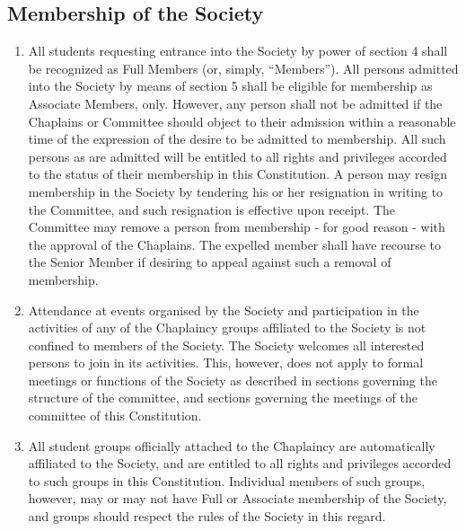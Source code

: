 \documentclass[11pt]{article}
\begin{document}
\subsection{Membership of the Society}
\begin{enumerate}
\item All students requesting entrance into the Society by power of section 4 shall be recognized as Full Members (or, simply, ``Members''). All persons admitted into the Society by means of section 5 shall be eligible for membership as Associate Members, only. However, any person shall not be admitted if the Chaplains or Committee should object to their admission within a reasonable time of the expression of the desire to be admitted to membership. All such persons as are admitted will be entitled to all rights and privileges accorded to the status of their membership in this Constitution. A person may resign membership in the Society by tendering his or her resignation in writing to the Committee, and such resignation is effective upon receipt.  The Committee may remove a person from membership - for good reason - with the approval of the Chaplains. The expelled member shall have recourse to the Senior Member if desiring to appeal against such a removal of membership.
\item Attendance at events organised by the Society and participation in the activities of any of the Chaplaincy groups affiliated to the Society is not confined to members of the Society. The Society welcomes all interested persons to join in its activities. This, however, does not apply to formal meetings or functions of the Society as described in sections governing the structure of the committee, and sections governing the meetings of the committee of this Constitution.
\item All student groups officially attached to the Chaplaincy are automatically affiliated to the Society, and are entitled to all rights and privileges accorded to such groups in this Constitution. Individual members of such groups, however, may or may not have Full or Associate membership of the Society, and groups should respect the rules of the Society in this regard.
\end{enumerate}
\end{document}

